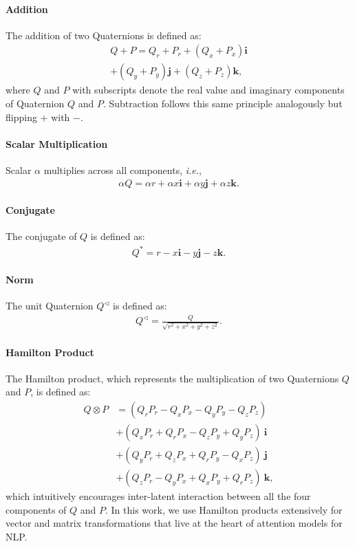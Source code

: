 \documentclass[11pt,a4paper]{article}
\def \bi {\mathbf{i}}
\def \bj {\mathbf{j}}
\def \bk {\mathbf{k}}
\begin{document}
\paragraph{Addition} The addition of two Quaternions is defined as:
\begin{align*}
Q+P=
Q_r + P_r + (Q_x + P_x)\bi  \\+ (Q_y + P_y)\bj + (Q_z + P_z)\bk,
\end{align*}
where $Q$ and $P$ with subscripts denote the real value and imaginary components of Quaternion $Q$ and $P$.
Subtraction follows this same principle analogously but flipping $+$ with $-$.
\paragraph{Scalar Multiplication} Scalar $\alpha$ multiplies across all components, \emph{i.e.},
\begin{align*}
\alpha Q = \alpha r + \alpha x \bi + \alpha y \bj +\alpha z \bk.
\end{align*}
\paragraph{Conjugate} The conjugate of $Q$ is defined as:
\begin{align*}
Q^* = r - x\bi - y\bj - z\bk.
\end{align*}
\paragraph{Norm} The unit Quaternion $Q^{\triangleleft}$ is defined as:
\begin{align*}
Q^{\triangleleft} = \frac{Q}{\sqrt{r^2 + x^2 + y^2 + z^2}}.
\end{align*}
\paragraph{Hamilton Product} The Hamilton product, which represents the multiplication of two Quaternions $Q$ and $P$, is defined as:
\begin{align}
\label{eq:hamilton}
Q \otimes P &= (Q_rP_r - Q_xP_x - Q_yP_y - Q_zP_z) \nonumber
         \\ &+ (Q_xP_r + Q_rP_x - Q_zP_y + Q_yP_z)\:\bi \nonumber
         \\ &+ (Q_yP_r + Q_zP_x + Q_rP_y - Q_xP_z)\:\bj \nonumber
         \\ &+ (Q_zP_r - Q_yP_x + Q_xP_y + Q_rP_z)\: \bk,
\end{align}
which intuitively encourages inter-latent interaction between all the four components of $Q$ and $P$. In this work, we use Hamilton products extensively for vector and matrix transformations that live at the heart of attention models for NLP.
\end{document}
